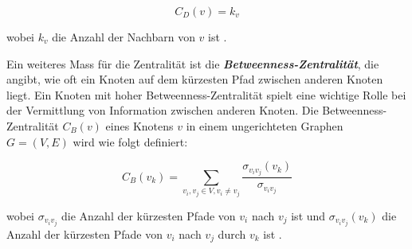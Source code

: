 $$C_D(v) = k_v$$

wobei $k_v$ die Anzahl der Nachbarn von $v$ ist \cite[p.~314]{emmert-streib_mathematical_2020}.

Ein weiteres Mass für die Zentralität ist die \textbf{\textit{Betweenness-Zentralität}}, die angibt, wie oft ein Knoten auf dem kürzesten Pfad zwischen anderen Knoten liegt.
Ein Knoten mit hoher Betweenness-Zentralität spielt eine wichtige Rolle bei der Vermittlung von Information zwischen anderen Knoten.
Die Betweenness-Zentralität $C_B(v)$ eines Knotens $v$ in einem ungerichteten Graphen $G=(V,E)$ wird wie folgt definiert:

$$C_B(v_k) = \sum_{v_i, v_j \in V, v_i \ne v_j} \frac{\sigma_{v_i v_j}(v_k)}{\sigma_{v_i v_j}}$$

wobei $\sigma_{v_i v_j}$ die Anzahl der kürzesten Pfade von $v_i$ nach $v_j$ ist und $\sigma_{v_i v_j}(v_k)$ die Anzahl der kürzesten Pfade von $v_i$ nach $v_j$ durch $v_k$ ist \cite[p.~314]{emmert-streib_mathematical_2020}.
